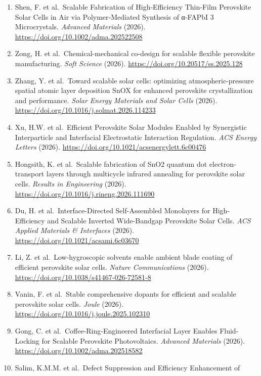 \documentclass[
  11pt,
]{article}
\begin{document}
\begin{enumerate}
  Loss in Scalable Perovskite Solar Cells. \emph{Advanced Materials}
  (2026). \url{https://doi.org/10.1002/adma.202520776}
\item
  Shen, F. et al.~Scalable Fabrication of High‐Efficiency Thin‐Film
  Perovskite Solar Cells in Air via Polymer‐Mediated Synthesis of
  α‐FAPbI 3 Microcrystals. \emph{Advanced Materials} (2026).
  \url{https://doi.org/10.1002/adma.202522508}
\item
  Zong, H. et al.~Chemical-mechanical co-design for scalable flexible
  perovskite manufacturing. \emph{Soft Science} (2026).
  \url{https://doi.org/10.20517/ss.2025.128}
\item
  Zhang, Y. et al.~Toward scalable solar cells: optimizing
  atmospheric-pressure spatial atomic layer deposition SnOX for enhanced
  perovskite crystallization and performance. \emph{Solar Energy
  Materials and Solar Cells} (2026).
  \url{https://doi.org/10.1016/j.solmat.2026.114233}
\item
  Xu, H.W. et al.~Efficient Perovskite Solar Modules Enabled by
  Synergistic Interparticle and Interfacial Electrostatic Interaction
  Regulation. \emph{ACS Energy Letters} (2026).
  \url{https://doi.org/10.1021/acsenergylett.6c00476}
\item
  Hongsith, K. et al.~Scalable fabrication of SnO2 quantum dot
  electron-transport layers through multicycle infrared annealing for
  perovskite solar cells. \emph{Results in Engineering} (2026).
  \url{https://doi.org/10.1016/j.rineng.2026.111690}
\item
  Du, H. et al.~Interface-Directed Self-Assembled Monolayers for
  High-Efficiency and Scalable Inverted Wide-Bandgap Perovskite Solar
  Cells. \emph{ACS Applied Materials \& Interfaces} (2026).
  \url{https://doi.org/10.1021/acsami.6c03670}
\item
  Li, Z. et al.~Low-hygroscopic solvents enable ambient blade coating of
  efficient perovskite solar cells. \emph{Nature Communications} (2026).
  \url{https://doi.org/10.1038/s41467-026-72581-8}
\item
  Vanin, F. et al.~Stable comprehensive dopants for efficient and
  scalable perovskite solar cells. \emph{Joule} (2026).
  \url{https://doi.org/10.1016/j.joule.2025.102310}
\item
  Gong, C. et al.~Coffee‐Ring‐Engineered Interfacial Layer Enables
  Fluid‐Locking for Scalable Perovskite Photovoltaics. \emph{Advanced
  Materials} (2026). \url{https://doi.org/10.1002/adma.202518582}
\item
  Salim, K.M.M. et al.~Defect Suppression and Efficiency Enhancement of

\end{enumerate}
\end{document}
